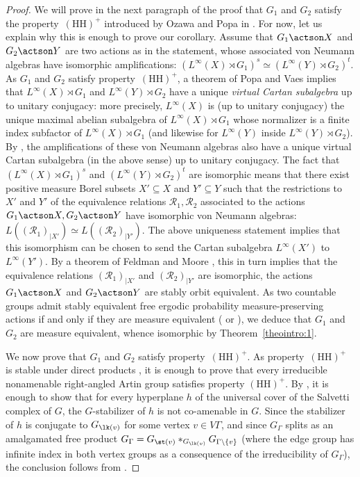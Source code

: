 \begin{proof}
We will prove in the next paragraph of the proof that $G_1$ and $G_2$ satisfy the property~$\mathrm{(HH)}^+$ introduced by Ozawa and Popa in \cite[Def.\,1]{OP}. For now, let us explain why this is enough to prove our corollary. Assume that $G_1\actson X$ and $G_2\actson Y$ are two actions as in the statement, whose associated von Neumann algebras have isomorphic amplifications: $(L^\infty(X)\rtimes G_1)^s\simeq (L^\infty(Y)\rtimes G_2)^t$. As $G_1$ and $G_2$ satisfy property~$\mathrm{(HH)}^+$, a theorem of Popa and Vaes \cite[Th.\,1.2 and Remark~1.3]{PV1} implies that $L^\infty(X)\rtimes G_1$ and $L^\infty(Y)\rtimes G_2$ have a unique \emph{virtual Cartan subalgebra} up to unitary conjugacy: more precisely, $L^{\infty}(X)$ is (up to unitary conjugacy) the unique maximal abelian subalgebra of $L^\infty(X)\rtimes G_1$ whose normalizer is a finite index subfactor of $L^\infty(X)\rtimes G_1$ (and likewise for $L^\infty(Y)$ inside $L^\infty(Y)\rtimes G_2$). By \cite[Prop.\,4.12]{OP1}, the amplifications of these von Neumann algebras also have a unique virtual Cartan subalgebra (in the above sense) up to unitary conjugacy. The fact that $(L^\infty(X)\rtimes G_1)^s$ and $(L^\infty(Y)\rtimes G_2)^t$ are isomorphic means that there exist positive measure Borel subsets $X'\subseteq X$ and $Y'\subseteq Y$ such that the restrictions to $X'$ and $Y'$ of the equivalence relations $\mathcal{R}_1,\mathcal{R}_2$ associated to the actions $G_1\actson X,G_2\actson Y$ have isomorphic von Neumann algebras: $L((\mathcal{R}_1)_{|X'})\simeq L((\mathcal{R}_2)_{|Y'})$. The above uniqueness statement implies that this isomorphism can be chosen to send the Cartan subalgebra $L^\infty(X')$ to $L^\infty(Y')$. By a theorem of Feldman and Moore \cite{FM}, this in turn implies that the equivalence relations $(\mathcal{R}_1)_{|X'}$ and $(\mathcal{R}_2)_{|Y'}$ are isomorphic, \ie the actions $G_1\actson X$ and $G_2\actson Y$ are stably orbit equivalent. As two countable groups admit stably equivalent free ergodic probability measure-preserving actions if and only if they are measure equivalent (\cf \cite[Th.\,3.3]{Fur2} or \cite[Th.\,2.3]{Gab2}), we deduce that $G_1$ and $G_2$ are measure equivalent, whence isomorphic by Theorem~\ref{theointro:1}.

We now prove that $G_1$ and $G_2$ satisfy property~$\mathrm{(HH)}^+$. As property~$\mathrm{(HH)}^+$ is stable under direct products \cite[Th.\,2.3(2)]{OP}, it is enough to prove that every irreducible nonamenable right-angled Artin group satisfies property $\mathrm{(HH)}^+$. By \cite[Th.\,2.3(5)]{OP}, it is enough to show that for every hyperplane $h$ of the universal cover of the Salvetti complex of $G$, the $G$-stabilizer of $h$ is not co-amenable in $G$. Since the stabilizer of $h$ is conjugate to $G_{\lk(v)}$ for some vertex $v\in V\Gamma$, and since $G_\Gamma$ splits as an amalgamated free product $G_\Gamma=G_{\st(v)}\ast_{G_{\lk(v)}}G_{\Gamma\setminus\{v\}}$ (where the edge group has infinite index in both vertex groups as a consequence of the irreducibility of $G_\Gamma$), the conclusion follows from \cite[Lem.\,2.4]{CE}.
\end{proof}

